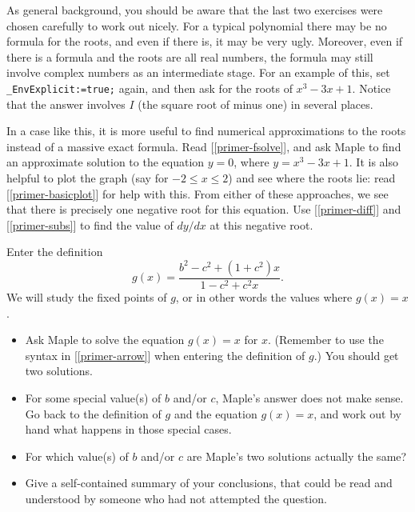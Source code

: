 \documentclass[a4paper,10pt]{amsbook}
\begin{document}
\begin{exercise}\label{ex-cubic-horrid}
 As general background, you should be aware that the last two
 exercises were chosen carefully to work out nicely.  For a typical
 polynomial there may be no formula for the roots, and even if there
 is, it may be very ugly.  Moreover, even if there is a formula and
 the roots are all real numbers, the formula may still involve complex
 numbers as an intermediate stage.  For an example of this, set
 \verb~_EnvExplicit:=true;~ again, and then ask for the roots of
 $x^3-3x+1$.  Notice that the answer involves $I$ (the square root of
 minus one) in several places.

 In a case like this, it is more useful to find numerical
 approximations to the roots instead of a massive exact
 formula.  Read [\ref{primer-fsolve}], and ask Maple to find an
 approximate solution to the equation $y=0$, where $y=x^3-3x+1$.
 It is also helpful to plot the graph (say for $-2\leq x\leq 2$) and
 see where the roots lie: read [\ref{primer-basicplot}] for help with
 this.  From either of these approaches, we see that there is
 precisely one negative root for this equation.  Use [\ref{primer-diff}]
 and [\ref{primer-subs}] to find the value of $dy/dx$ at this negative
 root. 
\end{exercise}

\begin{exercise}\label{ex-mobius-fix}
 Enter the definition
 \[ g(x) = \frac{b^2-c^2+(1+c^2)x}{1-c^2+ c^2x}. \]
 We will study the fixed points of $g$, or in other words the values
 where $g(x)=x$.  
 \begin{itemize}
  \item[(a)] Ask Maple to solve the equation $g(x)=x$ for
   $x$.  (Remember to use the syntax in [\ref{primer-arrow}]
   when entering the definition of $g$.)  You should get two
   solutions. 
  \item[(b)] For some special value(s) of $b$ and/or $c$, Maple's
   answer does not make sense.  Go back to the definition of $g$ and
   the equation $g(x)=x$, and work out by hand what happens in those
   special cases.
  \item[(c)] For which value(s) of $b$ and/or $c$ are Maple's two
   solutions actually the same?
  \item[(d)] Give a self-contained summary of your conclusions, that
   could be read and understood by someone who had not attempted the
   question. 
 \end{itemize}
\end{exercise}
\end{document}
